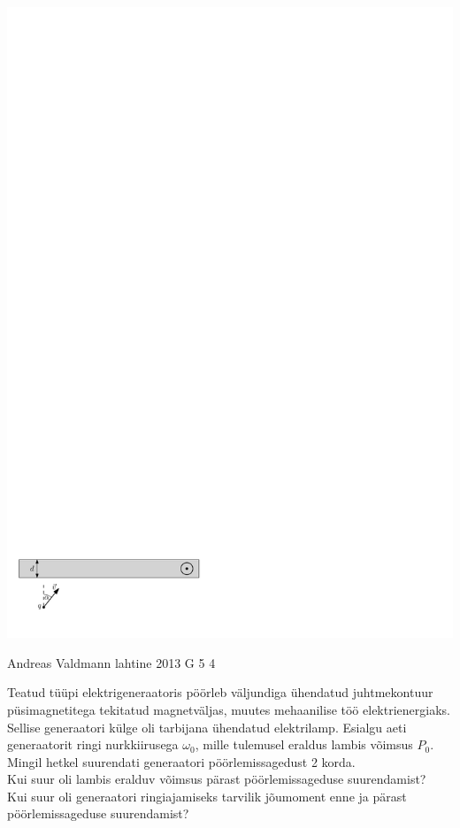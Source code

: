 \documentclass[11pt]{article}
\begin{document}
{{\begin{center}
\includegraphics[width=\linewidth]{2013-lahg-02-magnetpeegeljoonis_ipe}
\end{center}
\fi
}

{Andreas Valdmann} %
{lahtine} %
{2013} %
{G 5} %
{4} %
{
\ifStatement
Teatud tüüpi elektrigeneraatoris pöörleb väljundiga ühendatud juhtmekontuur
püsimagnetitega tekitatud magnetväljas, muutes mehaanilise töö elektrienergiaks.
Sellise generaatori külge oli tarbijana ühendatud elektrilamp. Esialgu aeti
generaatorit ringi nurkkiirusega $\omega_0$, mille tulemusel eraldus lambis
võimsus $P_0$. Mingil hetkel suurendati generaatori pöörlemissagedust 2 korda.\\
\osa Kui suur oli lambis eralduv võimsus pärast pöörlemissageduse suurendamist?\\
\osa Kui suur oli generaatori ringiajamiseks tarvilik jõumoment enne ja
pärast pöörlemissageduse suurendamist?

}}
\end{document}
